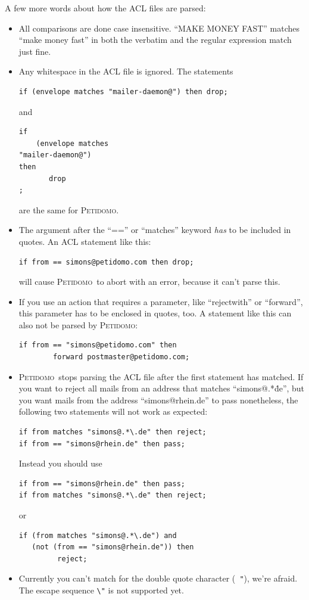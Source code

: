 \documentclass[a4paper]{report}
\newcommand{\Petidomo}{{\scshape Peti\-domo}}
\begin{document}
A few more words about how the ACL files are parsed:
\begin{itemize}

\item All comparisons are done case insensitive. ``MAKE MONEY FAST''
matches ``make money fast'' in both the verbatim and the regular
expression match just fine.

\item Any whitespace in the ACL file is ignored. The statements
\begin{verbatim}
if (envelope matches "mailer-daemon@") then drop;
\end{verbatim}
and
\begin{verbatim}
if
    (envelope matches
"mailer-daemon@")
then
       drop
;
\end{verbatim}
are the same for \Petidomo.

\item The argument after the ``=='' or ``matches'' keyword \emph{has}
to be included in quotes. An ACL statement like this:
\begin{verbatim}
if from == simons@petidomo.com then drop;
\end{verbatim}
will cause \Petidomo\ to abort with an error, because it can't parse
this.

\item If you use an action that requires a parameter, like
``rejectwith'' or ``forward'', this parameter has to be enclosed in
quotes, too. A statement like this can also not be parsed by
\Petidomo:
\begin{verbatim}
if from == "simons@petidomo.com" then
        forward postmaster@petidomo.com;
\end{verbatim}

\item \Petidomo\ stops parsing the ACL file after the first statement
has matched. If you want to reject all mails from an address that
matches ``simons@.*\.de'', but you want mails from the address
``simons@rhein.de'' to pass nonetheless, the following two statements
will not work as expected:
\begin{verbatim}
if from matches "simons@.*\.de" then reject;
if from == "simons@rhein.de" then pass;
\end{verbatim}

Instead you should use
\begin{verbatim}
if from == "simons@rhein.de" then pass;
if from matches "simons@.*\.de" then reject;
\end{verbatim}
or
\begin{verbatim}
if (from matches "simons@.*\.de") and
   (not (from == "simons@rhein.de")) then
         reject;
\end{verbatim}

\item Currently you can't match for the double quote character ({\tt
"}), we're afraid. The escape sequence {\tt \verb+\+"} is not
supported yet.

\end{itemize}
\end{document}

